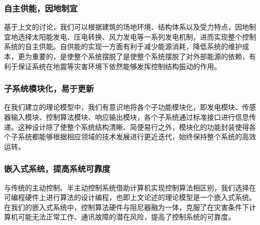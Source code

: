 \subsubsection{自主供能，因地制宜}
基于上文的讨论，我们可以根据建筑的场地环境、结构体系以及受力特点，因地制宜地选择太阳能发电、压电转换、风力发电等一系列发电机制，进而实现整个控制系统的自主供能。自供能的实现一方面有利于减少能源消耗，降低系统的维护成本，更为重要的，是使整个系统摆脱了是使整个系统摆脱了对外部能源的依赖，有利于保证系统在地震等灾害环境下依然能够发挥控制结构振动的作用。

\subsubsection{子系统模块化，易于更新}
在我们建立的理论模型中，我们有意识地将各个子功能模块化，即发电模块、传感器输入模块、控制算法模块、响应输出模块，各个子系统通过标准接口进行信息传递。这种设计除了使整个系统结构清晰、简便易行之外，模块化的功能封装使得各个子系统都能够根据相应领域的技术发展进行更近迭代，始终保持整个系统的高效运转。

\subsubsection{嵌入式系统，提高系统可靠度}
与传统的主动控制、半主动控制系统借助计算机实现控制算法相区别，我们选择在可编程硬件上进行算法的设计编程，也即上文论述的理论模型是一个嵌入式系统。在我们的嵌入式系统中，控制算法硬件与阻尼器融为一体，克服了在灾害条件下计算机可能无法正常工作、通讯故障的潜在风险，提高了控制系统的可靠度。
